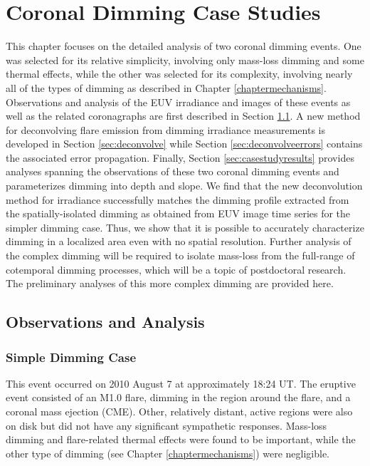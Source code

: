 \chapter{Coronal Dimming Case Studies}
\label{chaptercasestudy}

This chapter focuses on the detailed analysis of two coronal dimming events. One was selected for its relative simplicity, involving only mass-loss dimming and some thermal effects, while the other was selected for its complexity, involving nearly all of the types of dimming as described in Chapter \ref{chaptermechanisms}. Observations and analysis of the EUV irradiance and images of these events as well as the related coronagraphs are first described in Section \ref{sec:observations}. A new method for deconvolving flare emission from dimming irradiance measurements is developed in Section \ref{sec:deconvolve} while Section \ref{sec:deconvolveerrors} contains the associated error propagation. Finally, Section \ref{sec:casestudyresults} provides analyses spanning the observations of these two coronal dimming events and parameterizes dimming into depth and slope. We find that the new deconvolution method for irradiance successfully matches the dimming profile extracted from the spatially-isolated dimming as obtained from EUV image time series for the simpler dimming case. Thus, we show that it is possible to accurately characterize dimming in a localized area even with no spatial resolution. Further analysis of the complex dimming will be required to isolate mass-loss from the full-range of cotemporal dimming processes, which will be a topic of postdoctoral research. The preliminary analyses of this more complex dimming are provided here. 

\section{Observations and Analysis}
\label{sec:observations}

\subsection{Simple Dimming Case}
\label{sec:observationssimple}
This event occurred on 2010 August 7 at approximately 18:24 UT. The eruptive event consisted of an M1.0 flare, dimming in the region around the flare, and a coronal mass ejection (CME). Other, relatively distant, active regions were also on disk but did not have any significant sympathetic responses. Mass-loss dimming and flare-related thermal effects were found to be important, while the other type of dimming (see Chapter \ref{chaptermechanisms}) were negligible. 


